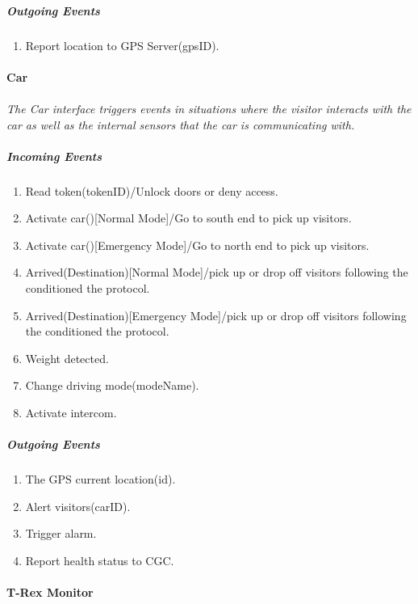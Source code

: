 \documentclass[12pt]{article}
\begin{document}
        \subparagraph{Outgoing Events}
        \begin{enumerate}
            \item Report location to GPS Server(gpsID).
        \end{enumerate}

    \paragraph{Car}
    \paragraph{} \textit{The Car interface triggers events in situations where the visitor interacts with the car as well as the internal sensors that the car is communicating with. }
        \subparagraph{Incoming Events}
        \begin{enumerate}
            \item Read token(tokenID)/Unlock doors or deny access. 
            \item Activate car()[Normal Mode]/Go to south end to pick up visitors.
            \item Activate car()[Emergency Mode]/Go to north end to pick up visitors.
            \item Arrived(Destination)[Normal Mode]/pick up or drop off visitors following the conditioned the protocol.
            \item Arrived(Destination)[Emergency Mode]/pick up or drop off visitors following the conditioned the protocol.
            \item Weight detected.
            \item Change driving mode(modeName).
            \item Activate intercom.
        \end{enumerate}
                
        \subparagraph{Outgoing Events}
        \begin{enumerate}
            \item The GPS current location(id).
            \item Alert visitors(carID).
            \item Trigger alarm.
            \item Report health status to CGC.
        \end{enumerate}

    \paragraph{T-Rex Monitor}
\end{document}
